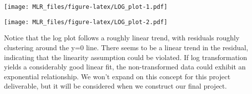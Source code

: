 \documentclass[
]{article}
\newenvironment{Shaded}{\begin{snugshade}}{\end{snugshade}}
\newcommand{\CommentTok}[1]{\textcolor[rgb]{0.56,0.35,0.01}{\textit{#1}}}
\newcommand{\DataTypeTok}[1]{\textcolor[rgb]{0.13,0.29,0.53}{#1}}
\newcommand{\DecValTok}[1]{\textcolor[rgb]{0.00,0.00,0.81}{#1}}
\newcommand{\FloatTok}[1]{\textcolor[rgb]{0.00,0.00,0.81}{#1}}
\newcommand{\KeywordTok}[1]{\textcolor[rgb]{0.13,0.29,0.53}{\textbf{#1}}}
\newcommand{\NormalTok}[1]{#1}
\newcommand{\OperatorTok}[1]{\textcolor[rgb]{0.81,0.36,0.00}{\textbf{#1}}}
\newcommand{\StringTok}[1]{\textcolor[rgb]{0.31,0.60,0.02}{#1}}
\begin{document}
\texttt{[image: MLR\_files/figure-latex/LOG\_plot-1.pdf]}

\begin{Shaded}
\end{Shaded}

\texttt{[image: MLR\_files/figure-latex/LOG\_plot-2.pdf]}

Notice that the log plot follows a roughly linear trend, with residuals
roughly clustering around the y=0 line. There seems to be a linear trend
in the residual, indicating that the linearity assumption could be
violated. If log transformation yields a considerably good linear fit,
the non-transformed data could exhibit an exponential relationship. We
won't expand on this concept for this project deliverable, but it will
be considered when we construct our final project.
\end{document}
